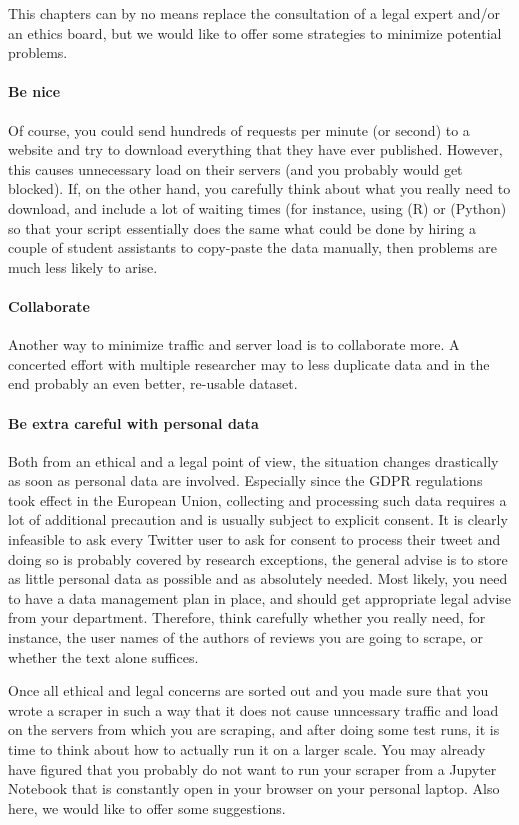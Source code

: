 This chapters can by no means replace the consultation of a legal
expert and/or an ethics board, but we would like to offer some
strategies to minimize potential problems.

\paragraph{Be nice} Of course, you could send hundreds of requests per minute (or second) to a website and try to download everything that they have ever published. However, this causes unnecessary load on their servers (and you probably would get blocked). If, on the other hand, you carefully think about what you really need to download, and include a lot of waiting times (for instance, using  (R) or  (Python) so that your script essentially does the same what could be done by hiring a couple of student assistants to copy-paste the data manually, then problems are much less likely to arise.

\paragraph{Collaborate} Another way to minimize traffic and server load is to collaborate more. A concerted effort with multiple researcher may to less duplicate data and in the end probably an even better, re-usable dataset.

\paragraph{Be extra careful with personal data} Both from an ethical and a legal point of view, the situation changes drastically as soon as personal data are involved. Especially since the GDPR regulations took effect in the European Union, collecting and processing such data requires a lot of additional precaution and is usually subject to explicit consent. It is clearly infeasible to ask every Twitter user to ask for consent to process their tweet and doing so is probably covered by research exceptions, the general advise is to store as little personal data as possible and as absolutely needed. Most likely, you need to have a data management plan in place, and should get appropriate legal advise from your department. Therefore, think carefully whether you really need, for instance, the user names of the authors of reviews you are going to scrape, or whether the text alone suffices.

Once all ethical and legal concerns are sorted out and you made sure that you wrote a scraper in such a way that it does not cause unncessary traffic and load on the servers from which you are scraping, and after doing some test runs, it is time to think about how to actually run it on a larger scale. You may already have figured that you probably do not want to run your scraper from a Jupyter Notebook that is constantly open in your browser on your personal laptop. Also here, we would like to offer some suggestions.

